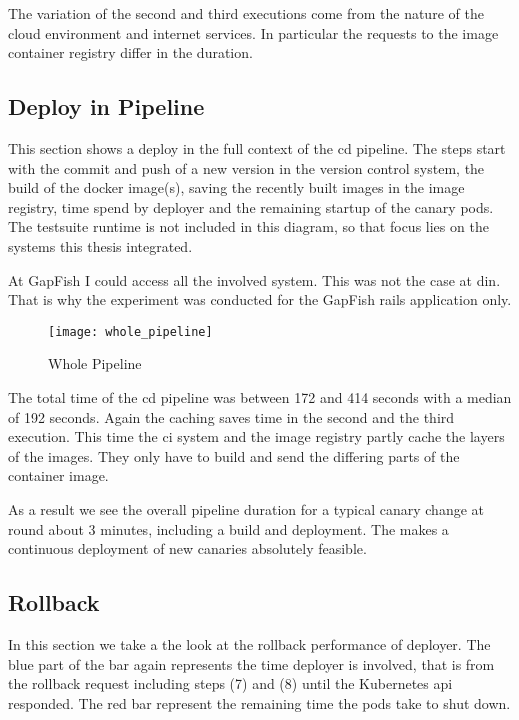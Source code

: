 The variation of the second and third executions come from the nature of the cloud
environment and internet services. In particular the requests to the image container
registry differ in the duration.

\subsection{Deploy in Pipeline}

This section shows a deploy in the full context of the \gls{cd} pipeline. The steps start
with the commit and push of a new version in the version control system, the build of the
docker image(s), saving the recently built images in the image registry, time spend by
deployer and the remaining startup of the canary pods. The testsuite runtime is not
included in this diagram, so that focus lies on the systems this thesis integrated.

At GapFish I could access all the involved system. This was not the case at \gls{din}. That is
why the experiment was conducted for the GapFish rails application only.

\begin{figure}[htbp]
  \centering
  \texttt{[image: whole\_pipeline]}
  \caption[Metric Comparison]{Whole Pipeline}
  \label{fig:whole pipeline}
\end{figure}

The total time of the \gls{cd} pipeline was between 172 and 414 seconds with a median of
192 seconds. Again the caching saves time in the second and the third execution. This time
the \gls{ci} system and the image registry partly cache the layers of the images. They
only have to build and send the differing parts of the container image.

As a result we see the overall pipeline duration for a typical canary change at round
about 3 minutes, including a build and deployment. The makes a continuous deployment of
new canaries absolutely feasible.

\subsection{Rollback}

In this section we take a the look at the rollback performance of deployer. The blue part
of the bar again represents the time deployer is involved, that is from the rollback
request including steps (7) and (8) until the Kubernetes api responded. The red bar
represent the remaining time the pods take to shut down.

